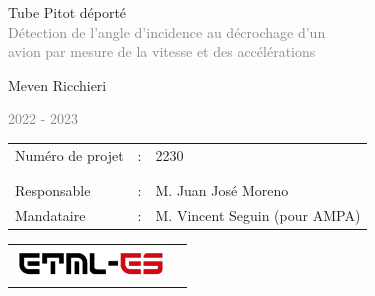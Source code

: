 \begin{titlepage}
    \begin{center}
        
        
        \null\vspace{2cm}
        {\huge Tube Pitot déporté} \\
        \textcolor{gray}{{Détection de l'angle d'incidence au décrochage d'un \\
        avion par mesure de la vitesse et des accélérations}}

        \vspace{0.5cm}
        Meven Ricchieri
        
        \textcolor{gray}{{2022 - 2023}}
        
    \end{center}

    
    \vspace{8cm}

    \begin{tabular} {l l l}

        Numéro de projet & : & 2230 \\\\\\
        
        
        
        Responsable & : & M. Juan José Moreno \\
        Mandataire & : & M. Vincent Seguin (pour AMPA)
        
    \end{tabular}
        
        
    \vspace{5cm}
        
    \begin{tabular} {cc}
        \parbox{0.3\textwidth}{\includegraphics[width=4cm]{Images/ETML-ES.png}}
    \end{tabular}
    
    
\vspace{2cm}
\end{titlepage}